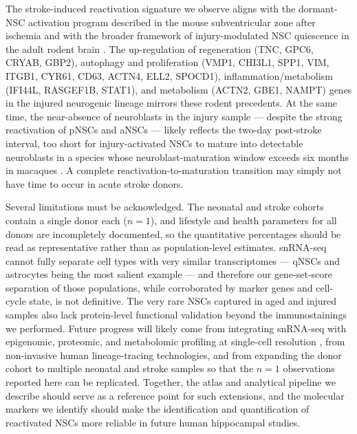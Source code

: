 \documentclass[11pt]{article}
\begin{document}
The stroke-induced reactivation signature we observe aligns with the
dormant-NSC activation program described in the mouse subventricular zone
after ischemia \cite{llorensbobadilla2015single} and with the broader
framework of injury-modulated NSC quiescence in the adult rodent brain
\cite{obernier2019neural,urban2019quiescence}. The up-regulation of
regeneration (TNC, GPC6, CRYAB, GBP2), autophagy and proliferation
(VMP1, CHI3L1, SPP1, VIM, ITGB1, CYR61, CD63, ACTN4, ELL2, SPOCD1),
inflammation/metabolism (IFI44L, RASGEF1B, STAT1), and metabolism (ACTN2,
GBE1, NAMPT) genes in the injured neurogenic lineage mirrors these
rodent precedents. At the same time, the near-absence of neuroblasts in
the injury sample --- despite the strong reactivation of pNSCs and aNSCs
--- likely reflects the two-day post-stroke interval, too short for
injury-activated NSCs to mature into detectable neuroblasts in a species
whose neuroblast-maturation window exceeds six months in macaques
\cite{kohler2011maturation}. A complete reactivation-to-maturation
transition may simply not have time to occur in acute stroke donors.

Several limitations must be acknowledged. The neonatal and stroke cohorts
contain a single donor each ($n=1$), and lifestyle and health parameters
for all donors are incompletely documented, so the quantitative
percentages should be read as representative rather than as
population-level estimates. snRNA-seq cannot fully separate cell types
with very similar transcriptomes --- qNSCs and astrocytes being the most
salient example --- and therefore our gene-set-score separation of those
populations, while corroborated by marker genes and cell-cycle state,
is not definitive. The very rare NSCs captured in aged and injured
samples also lack protein-level functional validation beyond the
immunostainings we performed. Future progress will likely come from
integrating snRNA-seq with epigenomic, proteomic, and metabolomic
profiling at single-cell resolution \cite{ayhan2021resolving,habib2017massively},
from non-invasive human lineage-tracing technologies, and from expanding
the donor cohort to multiple neonatal and stroke samples so that the
$n=1$ observations reported here can be replicated. Together, the atlas
and analytical pipeline we describe should serve as a reference point
for such extensions, and the molecular markers we identify should make
the identification and quantification of reactivated NSCs more reliable
in future human hippocampal studies.



\end{document}
